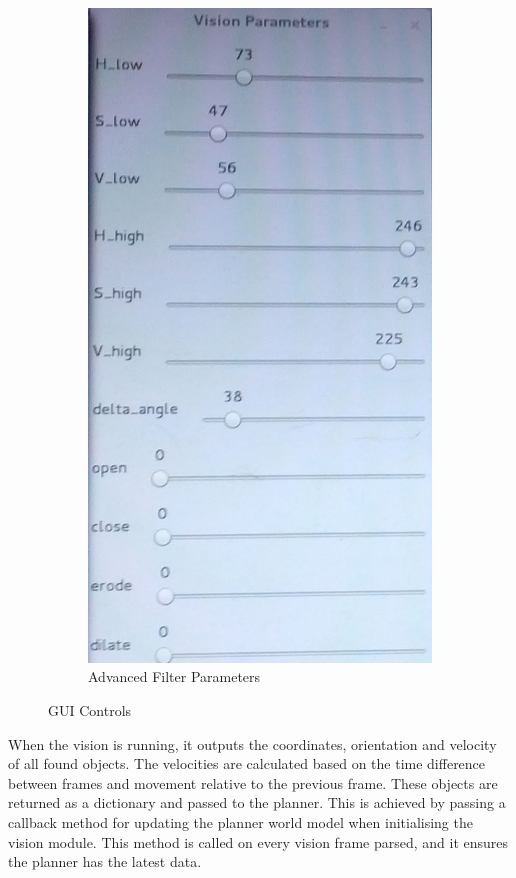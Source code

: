 \begin{figure}[H]
\begin{subfigure}{.5\textwidth}
\includegraphics[scale=0.2]{vision_params}
\caption{Advanced Filter Parameters}
\label{fig:params}
\end{subfigure}
\caption{GUI Controls}
\label{fig:sliders}
\end{figure}


When the vision is running, it outputs the coordinates, orientation and velocity of all found objects. The velocities are calculated based on the time difference between frames and movement relative to the previous frame. These objects are returned as a dictionary and passed to the planner. This is achieved by passing a callback method for updating the planner world model when initialising the vision module. This method is called on every vision frame parsed, and it ensures the planner has the latest data.
